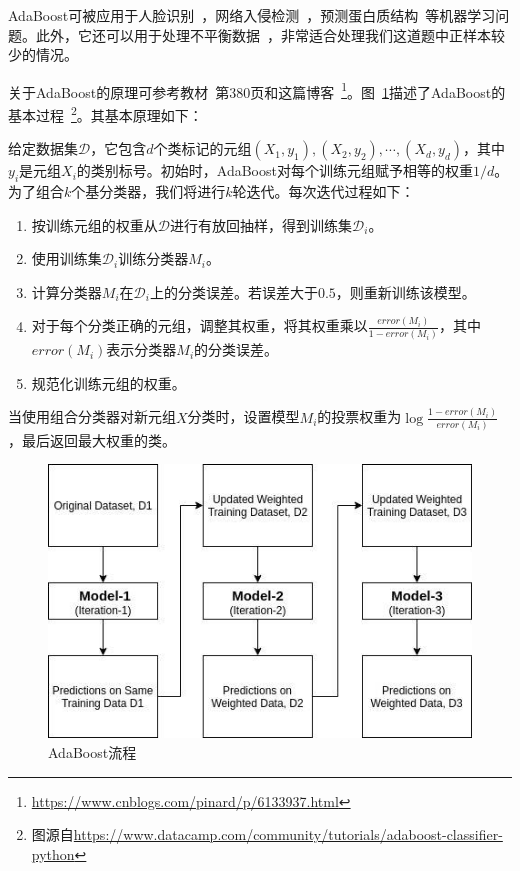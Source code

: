 \documentclass[12pt]{article} %
\newcommand\calD{\mathcal{D}}
\newcommand\XX{\boldsymbol{\mathit{X}}}
\begin{document}
\begin{sloppypar}
AdaBoost可被应用于人脸识别~\cite{wu2004fast}，网络入侵检测~\cite{hu2008adaboost}，预测蛋白质结构~\cite{niu2006predicting}等机器学习问题。此外，它还可以用于处理不平衡数据~\cite{viola2002fast}，非常适合处理我们这道题中正样本较少的情况。

关于AdaBoost的原理可参考教材~\cite{han2011data}第380页和这篇博客~\footnote{\url{https://www.cnblogs.com/pinard/p/6133937.html}}。图~\ref{fig:AdaBoost}描述了AdaBoost的基本过程~\footnote{图源自\url{https://www.datacamp.com/community/tutorials/adaboost-classifier-python}}。其基本原理如下：

给定数据集$\calD$，它包含$d$个类标记的元组$(\XX_1, y_1), (\XX_2, y_2), \cdots, (\XX_d, y_d)$，其中$y_i$是元组$\XX_i$的类别标号。初始时，AdaBoost对每个训练元组赋予相等的权重$1/d$。为了组合$k$个基分类器，我们将进行$k$轮迭代。每次迭代过程如下：
\begin{enumerate}
\item 按训练元组的权重从$\calD$进行有放回抽样，得到训练集$\calD_i$。
\item 使用训练集$\calD_i$训练分类器$M_i$。
\item 计算分类器$M_i$在$\calD_i$上的分类误差。若误差大于$0.5$，则重新训练该模型。
\item 对于每个分类正确的元组，调整其权重，将其权重乘以$\frac{error(M_i)}{1 - error(M_i)}$，其中$error(M_i)$表示分类器$M_i$的分类误差。
\item 规范化训练元组的权重。
\end{enumerate}

当使用组合分类器对新元组$\XX$分类时，设置模型$M_i$的投票权重为$\log\frac{1-error(M_i)}{error(M_i)}$，最后返回最大权重的类。

\begin{figure}[htbp]
	\centering
	\includegraphics[width=0.85\linewidth]{figure/AdaBoost.jpg}
	\caption{AdaBoost流程}
	\label{fig:AdaBoost}
\end{figure}


\end{sloppypar}
\end{document}
